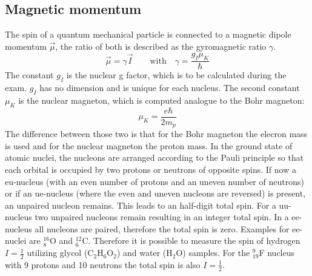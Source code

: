 \subsection{Magnetic momentum}
The spin of a quantum mechanical particle is connected to a magnetic dipole momentum $\vec{\mu}$, the ratio of both is described as the gyromagnetic ratio $\gamma$.
$$\vec{\mu}=\gamma\vec{I}\qquad \textrm{with}\quad \gamma = \frac{g_I\mu_K}{\hbar}$$
The constant $g_I$ is the nuclear g factor, which is to be calculated during the exam. $g_I$ has no dimension and is unique for each nucleus. The second constant $\mu_K$ is the nuclear magneton, which is computed analogue to the Bohr magneton:
$$\mu_K = \frac{e\hbar}{2m_p}$$
The difference between those two is that for the Bohr magneton the elecron mass is used and for the nuclear magneton the proton mass. 
In the ground state of atomic nuclei, the nucleons are arranged according to the Pauli principle so that each orbital is occupied by two protons or neutrons of opposite spins. If now a eu-nucleus (with an even number of protons and an uneven number of neutrons) or if an ue-nucleus (where the even and uneven nucleons are reversed) is present, an unpaired nucleon remains. This leads to an half-digit total spin. For a uu-nucleus two unpaired nucleons remain resulting in an integer total spin. In a ee-nucleus all nucleons are paired, therefore the total spin is zero. Examples for ee-nuclei are $^{16}_{8}$O and $^{12}_6$C. Therefore it is possible to measure the spin of hydrogen $I=\frac{1}{2}$ utilizing glycol (C$_2$H$_6$O$_2$) and water (H$_2$O) samples. For the $^{9}_{19}$F nucleus with 9 protons and 10 neutrons the total spin is also $I=\frac{1}{2}$.
